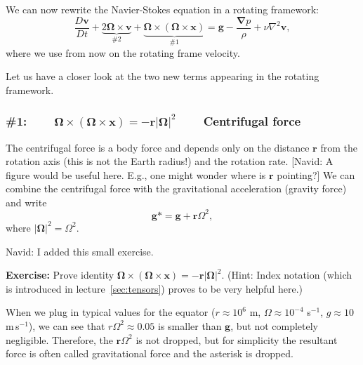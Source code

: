We can now rewrite the Navier-Stokes equation in a rotating framework:
\begin{equation}
\frac{D\boldsymbol{v}}{Dt} + \underbrace{2 \boldsymbol{\Omega} \times \boldsymbol{v}}_{\#2} + \underbrace{\boldsymbol{\Omega} \times (\boldsymbol{\Omega} \times \boldsymbol{x})}_{\#1} = \boldsymbol{g} - \frac{\boldsymbol{\nabla} p}{\rho} + \nu \nabla^2 \boldsymbol{v},
\end{equation}
where we use from now on the rotating frame velocity.

Let us have a closer look at the two new terms appearing in the rotating framework.

\subsubsection*{\#1: $\qquad \boldsymbol{\Omega} \times (\boldsymbol{\Omega} \times \boldsymbol{x}) = -\boldsymbol{r} |\boldsymbol{\Omega}|^2 \qquad$ Centrifugal force}

The centrifugal force is a body force and depends only on the distance $\boldsymbol{r}$ from the rotation axis (this is not the Earth radius!) and the rotation rate. {\color{red}[Navid: A figure would be useful here. E.g., one might wonder where is $\boldsymbol{r}$ pointing?]} We can combine the centrifugal force with the gravitational acceleration (gravity force) and write
\begin{equation}
\boldsymbol{g}* = \boldsymbol{g} + \boldsymbol{r}\Omega^2,
\end{equation}
where $|\boldsymbol{\Omega}|^2 = \Omega^2$. %

{\color{red} Navid: I added this small exercise.}

\noindent\textbf{Exercise:} Prove identity $\boldsymbol{\Omega} \times (\boldsymbol{\Omega} \times \boldsymbol{x}) = -\boldsymbol{r} |\boldsymbol{\Omega}|^2$. (Hint: Index notation (which is introduced in  lecture~\ref{sec:tensors})   proves to be very helpful here.)

When we plug in typical values for the equator ($r\approx 10^6$ m, $\Omega \approx 10^{-4}$ s$^{-1}$, $g \approx 10$ m\,s$^{-1}$), we can see that $r\Omega^2\approx0.05$ is smaller than $\boldsymbol{g}$, but not completely negligible. Therefore, the $\boldsymbol{r}\Omega^2$ is not dropped, but for simplicity the resultant force is often called gravitational force and the asterisk is dropped. 


